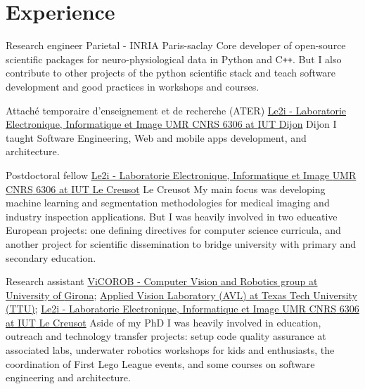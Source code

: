 
\section{Experience}

{Research engineer}
{Parietal - INRIA}
{}
{Paris-saclay}
{
  Core developer of open-source scientific packages for neuro-physiological
  data in Python and C\texttt{++}.
  But I also contribute to other projects of the python scientific stack and
  teach software development and good practices in workshops and courses.
}


{Attach\'{e} temporaire d'enseignement et de recherche (ATER)}
{\href{http://le2i.cnrs.fr/?lang=en}{Le2i - Laboratorie Electronique, Informatique et Image {UMR CNRS} 6306 at {IUT} Dijon}}
{}
{Dijon}
{
  I taught Software Engineering, Web and mobile apps development,
  and architecture.
}

{Postdoctoral fellow}
{
  \href{http://le2i.cnrs.fr/?lang=en}{Le2i - Laboratorie Electronique,
    Informatique et Image {UMR CNRS} 6306 at {IUT} Le Creusot}
}
{}
{Le Creusot}
{
  My main focus was developing machine learning and segmentation methodologies
  for medical imaging and industry inspection applications. But I was heavily
  involved in two educative European projects: one defining directives for
  computer science curricula, and another project for scientific dissemination
  to bridge university with primary and secondary education.
}

{}
{Research assistant}
{
  \href{http://vicorob.udg.edu}{{ViCOROB} - Computer Vision and Robotics group at {U}niversity of {G}irona};
  \href{http://www.depts.ttu.edu/ece/groups/appliedvision/}{Applied Vision
    Laboratory (AVL) at Texas Tech University (TTU)};
  \href{http://le2i.cnrs.fr/?lang=en}{Le2i - Laboratorie Electronique,
    Informatique et Image {UMR CNRS} 6306 at {IUT} Le Creusot}
}
{}
{}
{
  Aside of my PhD I was heavily involved in education, outreach and technology
  transfer projects:
  setup code quality assurance at associated labs,
  underwater robotics workshops for kids and enthusiasts,
  the coordination of First Lego League events,
  and
  some courses on software engineering and architecture.
}

